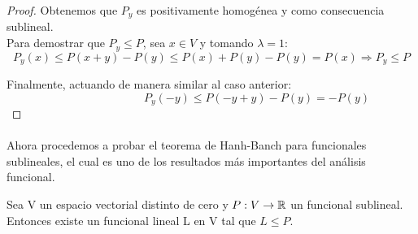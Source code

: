 \begin{proof}
		Obtenemos que $ P_y $ es positivamente homogénea y como consecuencia sublineal. \\
		
		Para demostrar que $ P_y \leq P $, sea $ x \in V $ y tomando $ \lambda = 1 $: 
		\[ P_y(x) \leq P(x+y) - P(y) \leq P(x)+ P(y) - P(y) = P(x) \Longrightarrow P_y \leq P  \]
		
		Finalmente, actuando de manera similar al caso anterior:
		\[ \qquad \qquad \qquad \qquad P_y(-y) \leq P(-y+y) - P(y) = -P(y)  \]
		
	\end{proof}
	\paragraph{} Ahora procedemos a probar el teorema de Hanh-Banch para funcionales sublineales, el cual es uno de los resultados más importantes del análisis funcional.	
	\begin{teoremaBox}\label{H-B}
		Sea V un espacio vectorial distinto de cero y $P:V \rightarrow \mathbb{R}$ un funcional sublineal. Entonces existe un funcional lineal L en V tal que $ L \leq P $.
	\end{teoremaBox}
